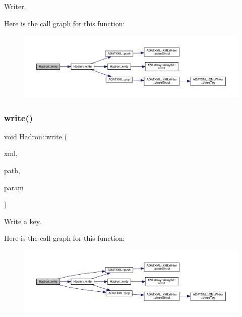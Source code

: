 Writer. 

Here is the call graph for this function\+:
\nopagebreak
\begin{figure}[H]
\begin{center}
\leavevmode
\includegraphics[width=350pt]{d1/daf/namespaceHadron_aca06b6220f81ed284c829138c237b84e_cgraph}
\end{center}
\end{figure}
\mbox{\label{namespaceHadron_ad598d89ca80f65de661af491b2ee51e2}} 
\subsubsection{\texorpdfstring{write()}{write()}\hspace{0.1cm}{\footnotesize\ttfamily [89/95]}}
{\footnotesize\ttfamily void Hadron\+::write (\begin{DoxyParamCaption}\item[{\mbox{\hyperlink{classADATXML_1_1XMLWriter}{X\+M\+L\+Writer}} \&}]{xml,  }\item[{const std\+::string \&}]{path,  }\item[{const \mbox{\hyperlink{structHadron_1_1KeySingleHadronQuarkDeriv__t}{Key\+Single\+Hadron\+Quark\+Deriv\+\_\+t}} \&}]{param }\end{DoxyParamCaption})}



Write a key. 

Here is the call graph for this function\+:
\nopagebreak
\begin{figure}[H]
\begin{center}
\leavevmode
\includegraphics[width=350pt]{d1/daf/namespaceHadron_ad598d89ca80f65de661af491b2ee51e2_cgraph}
\end{center}
\end{figure}
\mbox{\label{namespaceHadron_a3d7c7b8fcc5310fee44294d5900816fb}} 
